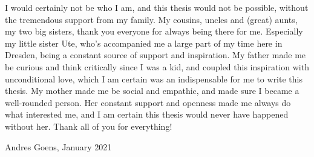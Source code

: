 I would certainly not be who I am, and this thesis would not be possible, without the tremendous support from my family. 
My cousins, uncles and (great) aunts, my two big sisters, thank you everyone for always being there for me. 
Especially my little sister Ute, who's accompanied me a large part of my time here in Dresden, being a constant source of support and inspiration.
My father made me be curious and think critically since I was a kid, and coupled this inspiration with unconditional love, which I am certain was an indispensable for me to write this thesis.
My mother made me be social and empathic, and made sure I became a well-rounded person.
Her constant support and openness made me always do what interested me, and I am certain this thesis would never have happened without her.
Thank all of you for everything!

Andres Goens, January 2021
